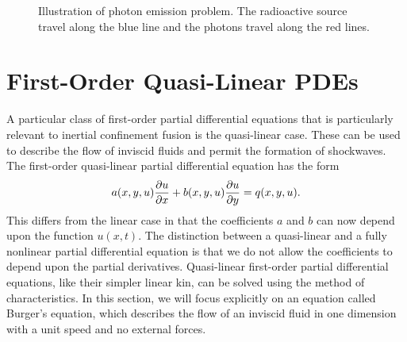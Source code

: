\begin{figure}[tb!]
\begin{center}
\caption{Illustration of photon emission problem. The radioactive source travel along the blue line and the photons travel along the red lines.}
\label{Fig:pde_photonTrajectories}
\end{center}
\end{figure}

\section{First-Order Quasi-Linear PDEs}

A particular class of first-order partial differential equations that is particularly relevant to inertial confinement fusion is the quasi-linear case. These can be used to describe the flow of inviscid fluids and permit the formation of shockwaves. The first-order quasi-linear partial differential equation has the form
\begin{align}
  a(x,y,u) \frac{ \partial {u} }{ \partial {x} } + b(x,y,u) \frac{ \partial {u} }{ \partial {y} } = q(x,y,u) .
\end{align}
This differs from the linear case in that the coefficients $a$ and $b$ can now depend upon the function $u(x,t)$. The distinction between a quasi-linear and a fully nonlinear partial differential equation is that we do not allow the coefficients to depend upon the partial derivatives. Quasi-linear first-order partial differential equations, like their simpler linear kin, can be solved using the method of characteristics. In this section, we will focus explicitly on an equation called Burger's equation, which describes the flow of an inviscid fluid in one dimension with a unit speed and no external forces.

